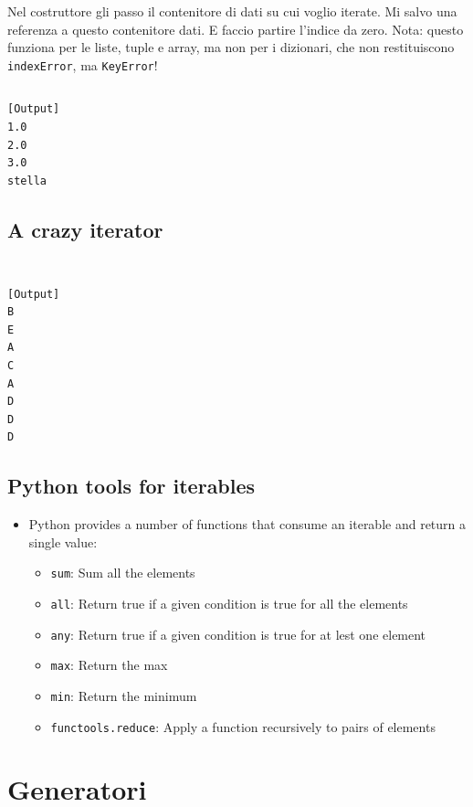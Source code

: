 \inputminted{python}{snippets/simple_iterator.py}
Nel costruttore gli passo il contenitore di dati su cui voglio iterate. Mi salvo una referenza a questo contenitore dati. E faccio partire l'indice da zero.
Nota: questo funziona per le liste, tuple e array, ma non per i dizionari, che non restituiscono \texttt{indexError}, ma \texttt{KeyError}!


\inputminted{python}{snippets/test_simple_iterator.py}

\begin{verbatim}
[Output]
1.0
2.0
3.0
stella
\end{verbatim}

\subsection{A crazy iterator}
\inputminted{python}{snippets/crazy_iterator.py}

\inputminted{python}{snippets/test_crazy_iterator.py}

\begin{verbatim}
[Output]
B
E
A
C
A
D
D
D
\end{verbatim}

\subsection{Python tools for iterables}

  \begin{itemize}
    \item Python provides a number of functions that consume an iterable and return a single value:
    \begin{itemize}
      \item \texttt{sum}: Sum all the elements
      \item \texttt{all}: Return true if a given condition is true for all the elements
      \item \texttt{any}: Return true if a given condition is true for at lest one element
      \item \texttt{max}: Return the max
      \item \texttt{min}: Return the minimum
      \item \texttt{functools.reduce}: Apply a function recursively to pairs of elements
    \end{itemize}
  \end{itemize}

\section{Generatori}


